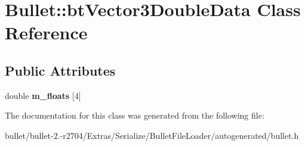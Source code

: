 \hypertarget{class_bullet_1_1bt_vector3_double_data}{\section{Bullet\+:\+:bt\+Vector3\+Double\+Data Class Reference}
\label{class_bullet_1_1bt_vector3_double_data}
}
\subsection*{Public Attributes}
\begin{DoxyCompactItemize}
\item 
\hypertarget{class_bullet_1_1bt_vector3_double_data_ada2ff769e008973df5aee7e27a6910a1}{double {\bfseries m\+\_\+floats} \mbox{[}4\mbox{]}}\label{class_bullet_1_1bt_vector3_double_data_ada2ff769e008973df5aee7e27a6910a1}

\end{DoxyCompactItemize}


The documentation for this class was generated from the following file\+:\begin{DoxyCompactItemize}
\item 
bullet/bullet-\/2.-\/r2704/\+Extras/\+Serialize/\+Bullet\+File\+Loader/autogenerated/bullet.\+h\end{DoxyCompactItemize}
